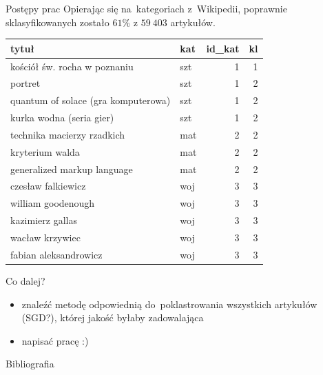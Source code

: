 \documentclass[11pt,pdftex,mathserif]{beamer}\usepackage[]{graphicx}\usepackage[]{color}
\theoremstyle{definition}
\begin{document}
\begin{frame}{Postępy prac}
Opierając się na~kategoriach z~Wikipedii, poprawnie sklasyfikowanych zostało $61\%$ z $59\ 403$ artykułów.
\begin{tabular}{|l|l|r|r|}
  \hline
tytuł & kat & id\_kat & kl \\ 
  \hline
kościół św. rocha w poznaniu & szt & 1 & 1 \\ 
  portret & szt & 1 & 2 \\ 
  quantum of solace (gra komputerowa) & szt & 1 & 2 \\ 
  kurka wodna (seria gier) & szt & 1 & 2 \\ 
  technika macierzy rzadkich & mat & 2 & 2 \\ 
  kryterium walda & mat & 2 & 2 \\ 
  generalized markup language & mat & 2 & 2 \\ 
  czesław falkiewicz & woj & 3 & 3 \\ 
  william goodenough & woj & 3 & 3 \\ 
  kazimierz gallas & woj & 3 & 3 \\ 
  wacław krzywiec & woj & 3 & 3 \\ 
  fabian aleksandrowicz & woj & 3 & 3 \\ 
   \hline
\end{tabular}

% 
% 
\end{frame}


\begin{frame}{Co dalej?}
\begin{itemize}
\item znaleźć metodę odpowiednią do~poklastrowania wszystkich artykułów (SGD?), której jakość byłaby zadowalająca
\item napisać pracę :)
\end{itemize}
\end{frame}

\begin{frame}{Bibliografia}
\nocite{Hornik2012:sphkmeans}
\nocite{Wild2002:sphkmeans}
\nocite{Loo2014:stringdist}


\end{frame}
\end{document}
